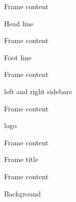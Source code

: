 \documentclass[10pt,blue,xcolor=pdftex,dvipsnames,table,handout]{beamer}
\begin{document}
		\begin{frame}[t]{Frame content}

			\begin{block} {Head line}
			\end{block}

		\end{frame}

		\begin{frame}[t]{Frame content}

			\begin{block} {Foot line}
			\end{block}

		\end{frame}

		\begin{frame}[t]{Frame content}

			\begin{block} {left and right sidebars}
			\end{block}

		\end{frame}


		\begin{frame}[t]{Frame content}

			\begin{block} {logo}
			\end{block}

		\end{frame}

		\begin{frame}[t]{Frame content}

			\begin{block} {Frame title}
			\end{block}

		\end{frame}


		\begin{frame}[t]{Frame content}

			\begin{block} {Background}
			\end{block}

		\end{frame}
\end{document}
